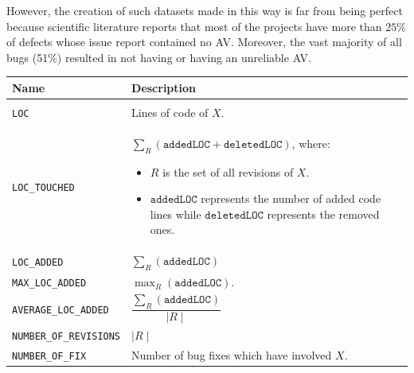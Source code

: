 \documentclass[sigconf]{acmart}
\begin{document}
However, the creation of such datasets made in this way is far from being perfect because scientific literature reports that most of the projects have more than $25\%$ of defects whose issue report contained no AV. Moreover, the vast majority of all bugs (51\%) resulted in not having or having an unreliable AV.







\begin{table}


\begin{tabular}{l|p{6cm}}

\toprule
\textbf{Name} & \textbf{Description} \\
\midrule

\\

\texttt{LOC} & Lines of code of $X$. 

\\

\texttt{LOC\_TOUCHED} & $\sum_R (\texttt{addedLOC} + \texttt{deletedLOC})$, where: 

\begin{itemize}
\item $R$ is the set of all revisions of $X$.
\item $\texttt{addedLOC}$ represents the number of added code lines while $\texttt{deletedLOC}$ represents the removed ones.
\end{itemize}

\\

\texttt{LOC\_ADDED} & $\sum_R (\texttt{addedLOC})$

\\

\texttt{MAX\_LOC\_ADDED} & $\max_R (\texttt{addedLOC})$.

\\
    
\texttt{AVERAGE\_LOC\_ADDED} & $\dfrac{\sum_R (\texttt{addedLOC})}{\mid R \mid}$

\\

\texttt{NUMBER\_OF\_REVISIONS} & $\mid R \mid$ 

\\

\texttt{NUMBER\_OF\_FIX} & Number of bug fixes which have involved $X$.

\\


\end{tabular}
\end{table}
\end{document}
